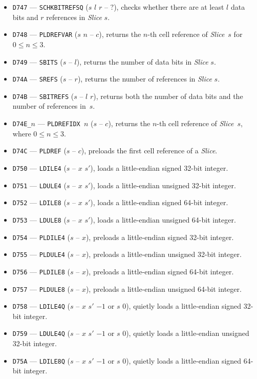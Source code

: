 \documentclass[12pt,oneside]{article}
\begin{document}
\begin{itemize}
\item {\tt D747} --- {\tt SCHKBITREFSQ} ($s$ $l$ $r$ -- $?$), checks whether there are at least $l$ data bits and $r$ references in {\em Slice\/} $s$.
\item {\tt D748} --- {\tt PLDREFVAR} ($s$ $n$ -- $c$), returns the $n$-th cell reference of {\em Slice\/}~$s$ for $0\leq n\leq 3$.
\item {\tt D749} --- {\tt SBITS} ($s$ -- $l$), returns the number of data bits in {\em Slice\/} $s$.
\item {\tt D74A} --- {\tt SREFS} ($s$ -- $r$), returns the number of references in {\em Slice\/} $s$.
\item {\tt D74B} --- {\tt SBITREFS} ($s$ -- $l$ $r$), returns both the number of data bits and the number of references in~$s$.
\item {\tt D74E\_$n$} --- {\tt PLDREFIDX $n$} ($s$ -- $c$), returns the $n$-th cell reference of {\em Slice\/}~$s$, where $0\leq n\leq 3$.
\item {\tt D74C} --- {\tt PLDREF} ($s$ -- $c$), preloads the first cell reference of a {\em Slice}.
\item {\tt D750} --- {\tt LDILE4} ($s$ -- $x$ $s'$), loads a little-endian signed 32-bit integer.
\item {\tt D751} --- {\tt LDULE4} ($s$ -- $x$ $s'$), loads a little-endian unsigned 32-bit integer.
\item {\tt D752} --- {\tt LDILE8} ($s$ -- $x$ $s'$), loads a little-endian signed 64-bit integer.
\item {\tt D753} --- {\tt LDULE8} ($s$ -- $x$ $s'$), loads a little-endian unsigned 64-bit integer.
\item {\tt D754} --- {\tt PLDILE4} ($s$ -- $x$), preloads a little-endian signed 32-bit integer.
\item {\tt D755} --- {\tt PLDULE4} ($s$ -- $x$), preloads a little-endian unsigned 32-bit integer.
\item {\tt D756} --- {\tt PLDILE8} ($s$ -- $x$), preloads a little-endian signed 64-bit integer.
\item {\tt D757} --- {\tt PLDULE8} ($s$ -- $x$), preloads a little-endian unsigned 64-bit integer.
\item {\tt D758} --- {\tt LDILE4Q} ($s$ -- $x$ $s'$ $-1$ or $s$ $0$), quietly loads a little-endian signed 32-bit integer.
\item {\tt D759} --- {\tt LDULE4Q} ($s$ -- $x$ $s'$ $-1$ or $s$ $0$), quietly loads a little-endian unsigned 32-bit integer.
\item {\tt D75A} --- {\tt LDILE8Q} ($s$ -- $x$ $s'$ $-1$ or $s$ $0$), quietly loads a little-endian signed 64-bit integer.

\end{itemize}
\end{document}
